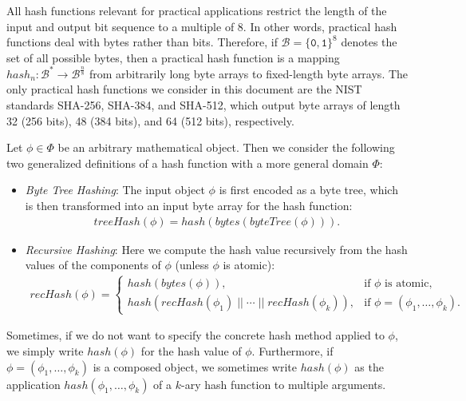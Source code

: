 \documentclass[bibtotoc,halfparskip,oneside]{scrreprt}
\newcommand{\bin}[1]{\ensuremath{\mathtt{#1}}}
\newcommand{\conc}{\ensuremath{\;||\;}}
\begin{document}
	All hash functions relevant for practical applications restrict the length of the input and output bit sequence to a multiple of $8$. In other words, practical hash functions deal with bytes rather than bits. Therefore, if $\mathcal{B}=\{\bin{0},\bin{1}\}^8$ denotes the set of all possible bytes, then a practical hash function is a mapping $\mathit{hash}_n:\mathcal{B}^*\rightarrow\mathcal{B}^{\frac{n}{8}}$ from arbitrarily long byte arrays to fixed-length byte arrays. The only practical hash functions we consider in this document are the NIST standards SHA-256, SHA-384, and SHA-512, which output byte arrays of length 32 (256 bits), 48 (384 bits), and 64 (512 bits), respectively.
	
	Let $\phi\in\Phi$ be an arbitrary mathematical object. Then we consider the following two generalized definitions of a hash function with a more general domain $\Phi$:
	\begin{itemize}
		\item \emph{Byte Tree Hashing}: The input object $\phi$ is first encoded as a byte tree, which is then transformed into an input byte array for the hash function:
		\begin{align}
			\mathit{treeHash}(\phi)=\mathit{hash}(\mathit{bytes}(\mathit{byteTree}(\phi))).
		\end{align}
		\item \emph{Recursive Hashing}: Here we compute the hash value recursively from the hash values of the components of $\phi$ (unless $\phi$ is atomic):
		\begin{align}
			\mathit{recHash}(\phi)=
			\begin{cases}
				\mathit{hash}(\mathit{bytes}(\phi)), & \text{if $\phi$ is atomic}, \\
				\mathit{hash}(\mathit{recHash}(\phi_1)\conc\cdots\conc\mathit{recHash}(\phi_k)), & \text{if $\phi=(\phi_1,\ldots,\phi_k)$}.
			\end{cases}
		\end{align}
	\end{itemize} 
	Sometimes, if we do not want to specify the concrete hash method applied to $\phi$, we simply write $\mathit{hash}(\phi)$ for the hash value of $\phi$. Furthermore, if $\phi=(\phi_1,\ldots,\phi_k)$ is a composed object, we sometimes write $\mathit{hash}(\phi)$ as the application $\mathit{hash}(\phi_1,\ldots,\phi_k)$ of a $k$-ary hash function to multiple arguments.
	
\end{document}
